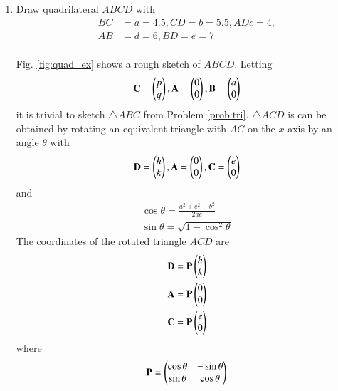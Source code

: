 \renewcommand{\theequation}{\theenumi}
\begin{enumerate}[label=\arabic*.,ref=\thesubsection.\theenumi]

\item Draw quadrilateral $ABCD$ with 
\begin{align}
BC &= a = 4.5,  
CD = b = 5.5, 
AD c = 4,
\\  
AB &= d = 6,
BD = e = 7 
\end{align}
\\
\solution Fig. \ref{fig:quad_ex} shows a rough sketch of $ABCD$. Letting
\begin{align}
\label{eq:tri_basic_new}
\mathbf{C} = \begin{pmatrix}p\\q\end{pmatrix}, \mathbf{A} = \begin{pmatrix}0\\0\end{pmatrix}, \mathbf{B} = \begin{pmatrix}a\\0\end{pmatrix}
\end{align}
%
it is trivial to sketch $\triangle ABC$ from  Problem \ref{prob:tri}.
%
$\triangle ACD$ is can be obtained by rotating an equivalent triangle with $AC$ on
the $x$-axis by an angle $\theta$ with
\begin{align}
\label{eq:tri_basic_rot}
\mathbf{D} = \begin{pmatrix}h\\k\end{pmatrix}, \mathbf{A} = \begin{pmatrix}0\\0\end{pmatrix}, \mathbf{C} = \begin{pmatrix}e\\0\end{pmatrix}
\end{align}
%
and
\begin{align}
\label{eq:tri_rot_ang}
\cos \theta = \frac{a^2+e^2-b^2}{2ae}
\\
\sin \theta = \sqrt{1-\cos^2\theta}
\end{align}
%
The coordinates of the rotated triangle $ACD$ are
\begin{align}
\label{eq:tri_rot_trans}
\mathbf{D} = \mathbf{P}\begin{pmatrix}h\\k\end{pmatrix}
\\
\mathbf{A} = \mathbf{P}\begin{pmatrix}0\\0\end{pmatrix}
\\
\mathbf{C} = \mathbf{P}\begin{pmatrix}e\\0\end{pmatrix}
\end{align}
%
where 
\begin{align}
\label{eq:tri_rot_mat}
\mathbf{P} = \begin{pmatrix}\cos\theta & -\sin \theta\\ \sin \theta & \cos \theta\end{pmatrix}
\end{align}

\end{enumerate}
